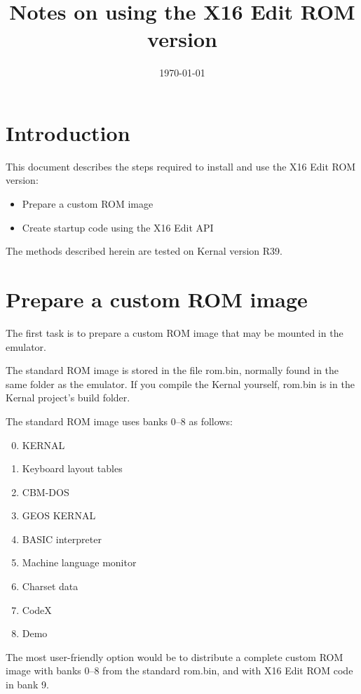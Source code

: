 \documentclass{article}
\title{Notes on using the X16 Edit ROM version}
\date{\today}
\begin{document}
\maketitle

\section{Introduction}

    This document describes the steps required to install and use the X16 Edit ROM version:

    \begin{itemize}
        \item Prepare a custom ROM image
        \item Create startup code using the X16 Edit API
    \end{itemize}

    \noindent The methods described herein are tested on Kernal version R39.

\section{Prepare a custom ROM image}

    The first task is to prepare a custom ROM image that may be mounted in the emulator.

    The standard ROM image is stored in the file rom.bin, normally found in the same folder as the emulator. If you compile the Kernal yourself,
    rom.bin is in the Kernal project's build folder.

    The standard ROM image uses banks 0--8 as follows:

    \begin{enumerate}
        \setcounter{enumi}{-1}
        \item KERNAL
        \item Keyboard layout tables
        \item CBM-DOS
        \item GEOS KERNAL
        \item BASIC interpreter
        \item Machine language monitor
        \item Charset data
        \item CodeX
        \item Demo
    \end{enumerate}

    \noindent The most user-friendly option would be to distribute a complete custom ROM image with
    banks 0--8 from the standard rom.bin, and with X16 Edit ROM code in bank 9.
\end{document}
